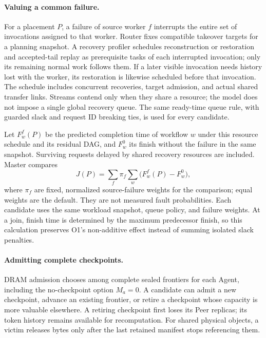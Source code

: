\paragraph{Valuing a common failure.}
For a placement $P$, a failure of source worker $f$ interrupts the entire
set of invocations assigned to that worker. Router fixes compatible
takeover targets for a planning snapshot. A recovery profiler schedules
reconstruction or restoration and accepted-tail replay as prerequisite
tasks of each interrupted invocation; only its remaining normal work
follows them. If a later visible invocation needs history lost with the
worker, its restoration is likewise scheduled before that invocation.
The schedule includes concurrent recoveries, target
admission, and actual shared transfer links. Streams
contend only when they share a resource; the model does not impose a
single global recovery queue. The same ready-time queue rule, with
guarded slack and request ID breaking ties, is used for every candidate.

Let $F_w^f(P)$ be the predicted completion time of workflow $w$ under
this resource schedule and its residual DAG, and $F_w^0$ its finish
without the failure in the same snapshot. Surviving requests delayed by
shared recovery resources are included. Master compares
\begin{equation}
 J(P)=\sum_f \pi_f\sum_w\bigl(F_w^f(P)-F_w^0\bigr),
 \label{eq:teacher-objective}
\end{equation}
where $\pi_f$ are fixed, normalized source-failure weights for the
comparison; equal weights are the default. They are not measured fault
probabilities. Each candidate uses the same workload snapshot, queue
policy, and failure weights. At a join, finish time is determined by the
maximum predecessor finish, so this calculation preserves O1's
non-additive effect instead of summing isolated slack penalties.

\paragraph{Admitting complete checkpoints.}
DRAM admission chooses among complete sealed frontiers for each Agent,
including the no-checkpoint option $M_a=0$. A candidate can admit a new
checkpoint, advance an existing frontier, or retire a checkpoint whose
capacity is more valuable elsewhere. A retiring checkpoint first loses
its Peer replicas; its token history remains available for recomputation.
For shared physical objects, a victim releases bytes only after the last
retained manifest stops referencing them.

